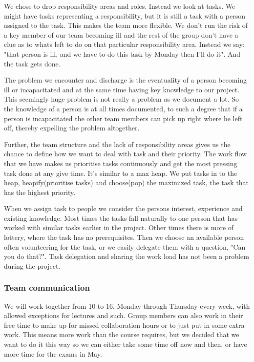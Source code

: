     We chose to drop responsibility areas and roles. Instead we look at tasks. We might have tasks representing a responsibility, but it is still a task with a person assigned to the task. This makes the team more flexible. We don't run the risk of a key member of our team becoming ill and the rest of the group don't have a clue as to whats left to do on that particular responsibility area. Instead we say: "that person is ill, and we have to do this task by Monday then I'll do it". And the task gets done.
    
    The problem we encounter and discharge is the eventuality of a person becoming ill or incapacitated and at the same time having key knowledge to our project. This seemingly huge problem is not really a problem as we document a lot. So the knowledge of a person is at all times documented, to such a degree that if a person is incapacitated the other team members can pick up right where he left off, thereby expelling the problem altogether. 
    
    Further, the team structure and the lack of responsibility areas gives us the chance to define how we want to deal with task and their priority. The work flow that we have makes us prioritise tasks continuously and get the most pressing task done at any give time. It's similar to a max heap. We put tasks in to the heap, heapify(prioritise tasks) and choose(pop) the maximized task, the task that has the highest priority. 
    
    When we assign task to people we consider the persons interest, experience and existing knowledge. Most times the tasks fall naturally to one person that has worked with similar tasks earlier in the project. Other times there is more of lottery, where the task has no prerequisites. Then we choose an available person often volunteering for the task, or we easily delegate them with a question, "Can you do that?". Task delegation and sharing the work load has not been a problem during the project.
    
    
    
    \subsubsection {Team communication}
    We will work together from 10 to 16, Monday through Thursday every week, with allowed exceptions for lectures and such. Group members can also work in their free time to make up for missed collaboration hours or to just put in some extra work. This means more work than the course requires, but we decided that we want to do it this way so we can either take some time off now and then, or have more time for the exams in May.

